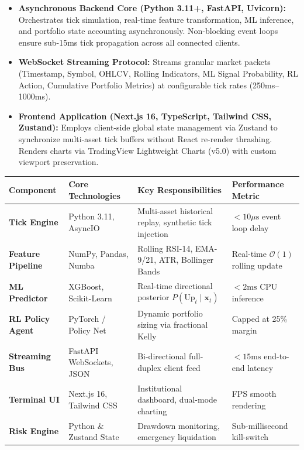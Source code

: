 \documentclass[11pt,a4paper]{article}
\begin{document}
\begin{itemize}[leftmargin=1.5em]
  \item \textbf{Asynchronous Backend Core (Python 3.11+, FastAPI, Uvicorn):} Orchestrates tick simulation, real-time feature transformation, ML inference, and portfolio state accounting asynchronously. Non-blocking event loops ensure sub-15ms tick propagation across all connected clients.
  \item \textbf{WebSocket Streaming Protocol:} Streams granular market packets (Timestamp, Symbol, OHLCV, Rolling Indicators, ML Signal Probability, RL Action, Cumulative Portfolio Metrics) at configurable tick rates (250ms--1000ms).
  \item \textbf{Frontend Application (Next.js 16, TypeScript, Tailwind CSS, Zustand):} Employs client-side global state management via Zustand to synchronize multi-asset tick buffers without React re-render thrashing. Renders charts via TradingView Lightweight Charts (v5.0) with custom viewport preservation.
\end{itemize}

\vspace{0.5em}
\begin{center}
\small
\begin{tabularx}{\textwidth}{l >{\raggedright\arraybackslash}p{3.2cm} >{\raggedright\arraybackslash}X >{\raggedright\arraybackslash}p{3.2cm}}
\toprule
\textbf{Component} & \textbf{Core Technologies} & \textbf{Key Responsibilities} & \textbf{Performance Metric} \\
\midrule
\textbf{Tick Engine} & Python 3.11, AsyncIO & Multi-asset historical replay, synthetic tick injection & $<10\mu\text{s}$ event loop delay \\
\textbf{Feature Pipeline} & NumPy, Pandas, Numba & Rolling RSI-14, EMA-9/21, ATR, Bollinger Bands & Real-time $\mathcal{O}(1)$ rolling update \\
\textbf{ML Predictor} & XGBoost, Scikit-Learn & Real-time directional posterior $P(\text{Up}_t \mid \mathbf{x}_t)$ & $<2\text{ms}$ CPU inference \\
\textbf{RL Policy Agent} & PyTorch / Policy Net & Dynamic portfolio sizing via fractional Kelly & Capped at 25\% margin \\
\textbf{Streaming Bus} & FastAPI WebSockets, JSON & Bi-directional full-duplex client feed & $<15\text{ms}$ end-to-end latency \\
\textbf{Terminal UI} & Next.js 16, Tailwind CSS & Institutional dashboard, dual-mode charting & 60 FPS smooth rendering \\
\textbf{Risk Engine} & Python \& Zustand State & Drawdown monitoring, emergency liquidation & Sub-millisecond kill-switch \\
\bottomrule
\end{tabularx}
\end{center}
\end{document}

